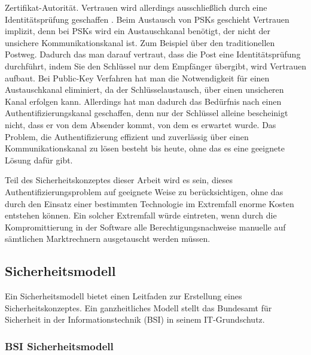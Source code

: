 \documentclass[11pt,a4paper]{report}
\begin{document}
Zertifikat-Autorität. Vertrauen wird allerdings ausschließlich durch eine Identitätsprüfung geschaffen \cite{gutmann8}. Beim Austausch von PSKs geschieht Vertrauen implizit, denn bei PSKs wird ein Austauschkanal benötigt, der nicht der unsichere Kommunikationskanal ist. Zum Beispiel über den traditionellen Postweg. Dadurch das man darauf vertraut, dass die Post eine Identitätsprüfung durchführt, indem Sie den Schlüssel nur dem Empfänger übergibt, wird Vertrauen aufbaut. Bei Public-Key Verfahren hat man die Notwendigkeit für einen Austauschkanal eliminiert, da der Schlüsselaustausch, über einen unsicheren Kanal erfolgen kann. Allerdings hat man dadurch das Bedürfnis nach einen Authentifizierungskanal geschaffen, denn nur der Schlüssel alleine bescheinigt nicht, dass er von dem Absender kommt, von dem es erwartet wurde. Das Problem, die Authentifizierung effizient und zuverlässig über einen Kommunikationskanal zu lösen besteht bis heute, ohne das es eine geeignete Lösung dafür gibt. 

Teil des Sicherheitskonzeptes dieser Arbeit wird es sein, dieses Authentifizierungsproblem auf geeignete Weise zu berücksichtigen, ohne das durch den Einsatz einer bestimmten Technologie im Extremfall enorme Kosten entstehen können. Ein solcher Extremfall würde eintreten, wenn durch die Kompromittierung in der Software alle Berechtigungsnachweise manuelle auf sämtlichen Marktrechnern ausgetauscht werden müssen. 

\subsection{Sicherheitsmodell}

Ein Sicherheitsmodell bietet einen Leitfaden zur Erstellung eines Sicherheitskonzeptes. Ein ganzheitliches Modell stellt das Bundesamt für Sicherheit in der Informationstechnik (BSI) in seinem IT-Grund\-schutz.  

\subsubsection{BSI Sicherheitsmodell}
\end{document}
